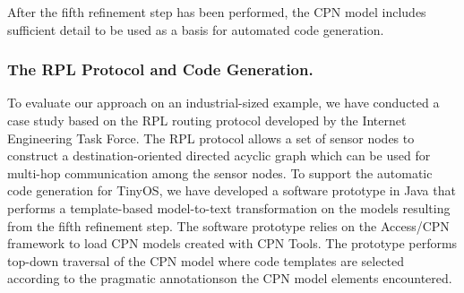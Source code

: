 \documentclass{llncs}
\begin{document}
\noindent
After the fifth refinement step has been performed, the CPN model
includes sufficient detail to be used as a basis for automated code
generation.
 
\vspace*{-0.75em}
\subsubsection{The RPL Protocol and Code Generation.}

To evaluate our approach on an industrial-sized example, we have
conducted a case study based on the RPL routing protocol
\cite{rplprotocol} developed by the Internet Engineering Task
Force. The RPL protocol allows a set of sensor nodes to construct a
destination-oriented directed acyclic graph which can be used for
multi-hop communication among the sensor nodes.  To support the
automatic code generation for TinyOS, we have developed a software
prototype in Java that performs a template-based model-to-text
transformation on the models resulting from the fifth refinement
step. The software prototype relies on the Access/CPN framework
\cite{accesscpn} to load CPN models created with CPN Tools. The
prototype performs top-down traversal of the CPN model where code
templates are selected according to the pragmatic annotationson the
CPN model elements encountered.





\end{document}

